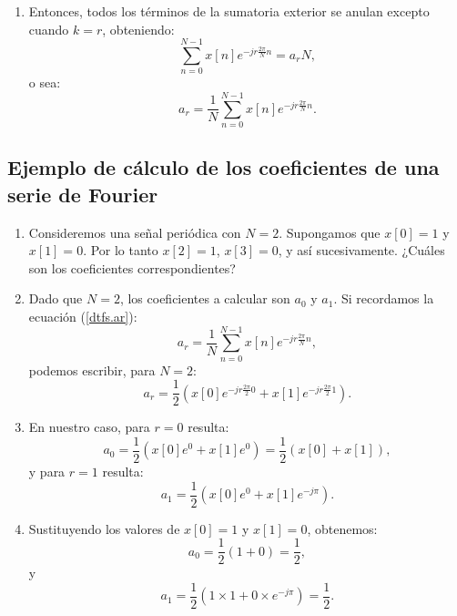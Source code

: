 \documentclass[11pt,a4paper,openany]{book}
\begin{document}
\begin{enumerate}
	\item Entonces, todos los términos de la sumatoria exterior se anulan excepto cuando $k=r$, obteniendo:
	\begin{equation}
		\sum_{n=0}^{N-1} x[n] e^{-jr\frac{2\pi}{N}n} = a_{r} N,
	\end{equation}
	o sea:
	\begin{equation}
		a_{r} = \frac{1}{N} \sum_{n=0}^{N-1} x[n] e^{-jr\frac{2\pi}{N}n}.
		\label{dtfs.ar}
	\end{equation}
\end{enumerate}

\subsection{Ejemplo de cálculo de los coeficientes de una serie de Fourier}
\begin{enumerate}
	\item Consideremos una señal periódica con $N = 2$. Supongamos que $x[0] = 1$ y $x[1] = 0$.
	Por lo tanto $x[2] = 1$, $x[3] = 0$, y así sucesivamente. ¿Cuáles son los coeficientes correspondientes?
	
	\item Dado que $N = 2$, los coeficientes a calcular son $a_{0}$ y $a_{1}$. Si recordamos la ecuación (\ref{dtfs.ar}):
	\begin{equation}
		a_{r} = \frac{1}{N} \sum_{n=0}^{N-1} x[n] e^{-jr\frac{2\pi}{N}n},
	\end{equation}
	podemos escribir, para $N = 2$:
	\begin{equation}
		a_{r} = \frac{1}{2} \left(x[0] e^{-jr\frac{2\pi}{2}0} + x[1] e^{-jr\frac{2\pi}{2}1}\right).
	\end{equation}
	
	\item En nuestro caso, para $r = 0$ resulta:
	\begin{equation}
		a_{0} = \frac{1}{2} \left(x[0] e^{0} + x[1] e^{0}\right) = \frac{1}{2} (x[0] + x[1]),
	\end{equation}
	y para $r = 1$ resulta:
	\begin{equation}
		a_{1} = \frac{1}{2} \left(x[0] e^{0} + x[1] e^{-j\pi}\right).
	\end{equation}
	
	\item Sustituyendo los valores de $x[0] = 1$ y $x[1] = 0$, obtenemos:
	\begin{equation}
		a_{0} = \frac{1}{2} (1 + 0) = \frac{1}{2},
	\end{equation}
	y
	\begin{equation}
		a_{1} = \frac{1}{2} (1 \times 1 + 0 \times e^{-j\pi}) = \frac{1}{2}.
	\end{equation}
\end{enumerate}
\end{document}
